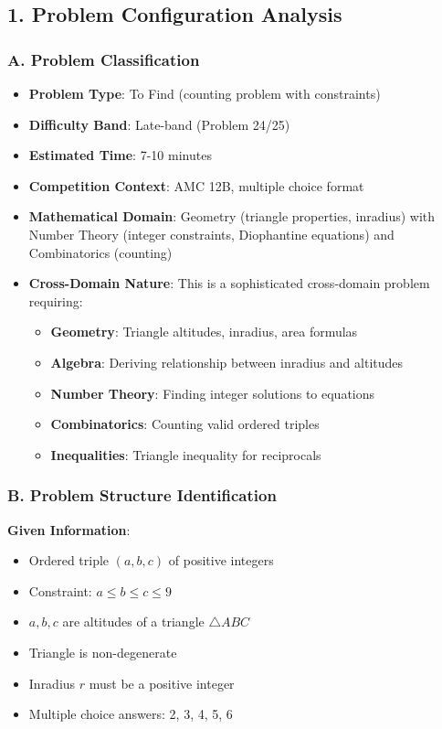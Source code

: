 \documentclass[12pt]{article}
\begin{document}
\begin{problemconfigbox}
\subsection*{1. Problem Configuration Analysis}

\subsubsection*{A. Problem Classification}

\begin{itemize}[leftmargin=*]
    \item \textbf{Problem Type}: To Find (counting problem with constraints)
    \item \textbf{Difficulty Band}: Late-band (Problem 24/25)
    \item \textbf{Estimated Time}: 7-10 minutes
    \item \textbf{Competition Context}: AMC 12B, multiple choice format
    \item \textbf{Mathematical Domain}: Geometry (triangle properties, inradius) with Number Theory (integer constraints, Diophantine equations) and Combinatorics (counting)
    \item \textbf{Cross-Domain Nature}: This is a sophisticated cross-domain problem requiring:
    \begin{itemize}
        \item \textbf{Geometry}: Triangle altitudes, inradius, area formulas
        \item \textbf{Algebra}: Deriving relationship between inradius and altitudes
        \item \textbf{Number Theory}: Finding integer solutions to equations
        \item \textbf{Combinatorics}: Counting valid ordered triples
        \item \textbf{Inequalities}: Triangle inequality for reciprocals
    \end{itemize}
\end{itemize}

\subsubsection*{B. Problem Structure Identification}

\textbf{Given Information}:
\begin{itemize}
    \item Ordered triple $(a, b, c)$ of positive integers
    \item Constraint: $a \leq b \leq c \leq 9$
    \item $a, b, c$ are altitudes of a triangle $\triangle ABC$
    \item Triangle is non-degenerate
    \item Inradius $r$ must be a positive integer
    \item Multiple choice answers: 2, 3, 4, 5, 6
\end{itemize}


\end{problemconfigbox}
\end{document}
